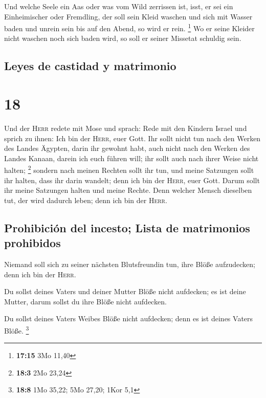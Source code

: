  Und welche Seele ein Aas oder was vom Wild zerrissen
ist, isst, er sei ein Einheimischer oder Fremdling, der soll sein Kleid
waschen und sich mit Wasser baden und unrein sein bis auf den Abend, so
wird er rein. \footnote{\textbf{17:15} 3Mo 11,40}  Wo er
seine Kleider nicht waschen noch sich baden wird, so soll er seiner
Missetat schuldig sein.

\hypertarget{leyes-de-castidad-y-matrimonio}{%
\subsection{Leyes de castidad y
matrimonio}\label{leyes-de-castidad-y-matrimonio}}

\hypertarget{section-17}{%
\section{18}\label{section-17}}

 Und der \textsc{Herr} redete mit Mose und sprach:
 Rede mit den Kindern Israel und sprich zu ihnen: Ich bin
der \textsc{Herr}, euer Gott.  Ihr sollt nicht tun nach
den Werken des Landes Ägypten, darin ihr gewohnt habt, auch nicht nach
den Werken des Landes Kanaan, darein ich euch führen will; ihr sollt
auch nach ihrer Weise nicht halten; \footnote{\textbf{18:3} 2Mo 23,24}
 sondern nach meinen Rechten sollt ihr tun, und meine
Satzungen sollt ihr halten, dass ihr darin wandelt; denn ich bin der
\textsc{Herr}, euer Gott.  Darum sollt ihr meine Satzungen
halten und meine Rechte. Denn welcher Mensch dieselben tut, der wird
dadurch leben; denn ich bin der \textsc{Herr}.

\hypertarget{prohibiciuxf3n-del-incesto-lista-de-matrimonios-prohibidos}{%
\subsection{Prohibición del incesto; Lista de matrimonios
prohibidos}\label{prohibiciuxf3n-del-incesto-lista-de-matrimonios-prohibidos}}

 Niemand soll sich zu seiner nächsten Blutsfreundin tun,
ihre Blöße aufzudecken; denn ich bin der \textsc{Herr}.

 Du sollst deines Vaters und deiner Mutter Blöße nicht
aufdecken; es ist deine Mutter, darum sollst du ihre Blöße nicht
aufdecken.

 Du sollst deines Vaters Weibes Blöße nicht aufdecken;
denn es ist deines Vaters Blöße. \footnote{\textbf{18:8} 1Mo 35,22; 5Mo
  27,20; 1Kor 5,1}

